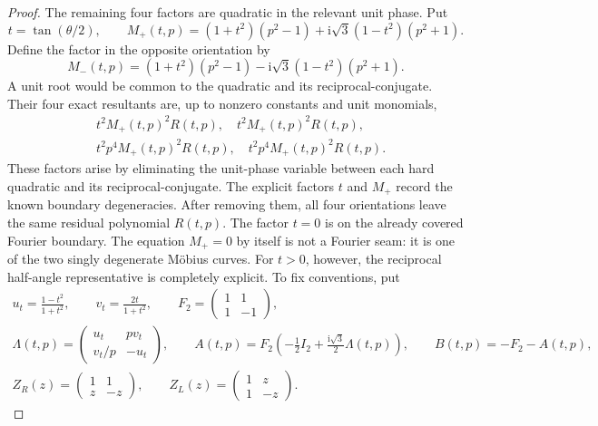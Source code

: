 \documentclass[aps,prx,reprint,nofootinbib,twoside,superscriptaddress,longbibliography,floatfix]{revtex4-2}
\theoremstyle{definition}
\newcommand{\I}{\mathrm i}
\begin{document}
\begin{proof}
The remaining four factors are quadratic in the relevant unit phase.  Put
\begin{equation}
t=\tan(\theta/2),\qquad
M_+(t,p)=(1+t^2)(p^2-1)
 +\I\sqrt3(1-t^2)(p^2+1).
\label{eq:supp-karlsson-Mplus}
\end{equation}
Define the factor in the opposite orientation by
\begin{equation}
M_-(t,p)=(1+t^2)(p^2-1)
 -\I\sqrt3(1-t^2)(p^2+1).
\label{eq:supp-karlsson-Mminus}
\end{equation}
A unit root would be common to the quadratic and its reciprocal-conjugate.  Their four exact resultants are, up to nonzero constants and unit monomials,
\begin{equation}
\begin{split}
&t^2M_+(t,p)^2R(t,p),\quad t^2M_+(t,p)^2R(t,p),\\
&t^2p^4M_+(t,p)^2R(t,p),\quad
t^2p^4M_+(t,p)^2R(t,p).
\end{split}
\label{eq:supp-karlsson-resultants}
\end{equation}
These factors arise by eliminating the unit-phase variable between each hard quadratic and its reciprocal-conjugate. The explicit factors $t$ and $M_+$ record the known boundary degeneracies. After removing them, all four orientations leave the same residual polynomial $R(t,p)$. The factor $t=0$ is on the already covered Fourier boundary.  The equation $M_+=0$ by itself is not a Fourier seam: it is one of the two singly degenerate M\"obius curves.  For $t>0$, however, the reciprocal half-angle representative is completely explicit.  To fix conventions, put
\begin{equation}
\begin{gathered}
 u_t=\frac{1-t^2}{1+t^2},\qquad v_t=\frac{2t}{1+t^2},\qquad
 F_2=\begin{pmatrix}1&1\\1&-1\end{pmatrix},\\
 \Lambda(t,p)=\begin{pmatrix}u_t&pv_t\\v_t/p&-u_t\end{pmatrix},\qquad
 A(t,p)=F_2\left(-\frac12I_2+\frac{\I\sqrt3}{2}\Lambda(t,p)\right),
 \qquad B(t,p)=-F_2-A(t,p),\\
 Z_R(z)=\begin{pmatrix}1&1\\z&-z\end{pmatrix},\qquad
 Z_L(z)=\begin{pmatrix}1&z\\1&-z\end{pmatrix}.

\end{gathered}
\end{equation}
\end{proof}
\end{document}
